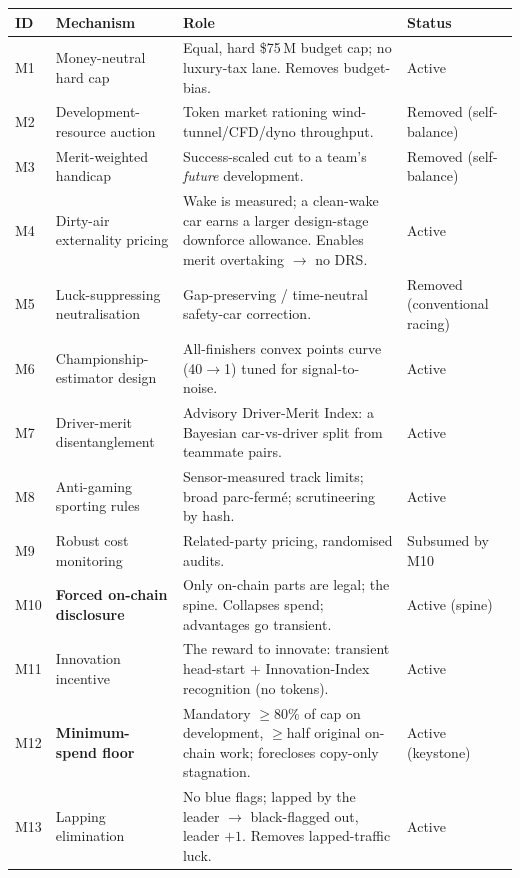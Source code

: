 \documentclass[11pt]{article}
\begin{document}
{\footnotesize
\begin{center}
\begin{tabular}{@{}p{} p{} p{} p{}@{}}
\toprule
\textbf{ID} & \textbf{Mechanism} & \textbf{Role} & \textbf{Status}\\
\midrule
M1 & Money-neutral hard cap & Equal, hard \$75\,M budget cap; no luxury-tax lane. Removes budget-bias. & Active\\
M2 & Development-resource auction & Token market rationing wind-tunnel/CFD/dyno throughput. & Removed (self-balance)\\
M3 & Merit-weighted handicap & Success-scaled cut to a team's \emph{future} development. & Removed (self-balance)\\
M4 & Dirty-air externality pricing & Wake is measured; a clean-wake car earns a larger design-stage downforce allowance. Enables merit overtaking $\to$ no DRS. & Active\\
M5 & Luck-suppressing neutralisation & Gap-preserving / time-neutral safety-car correction. & Removed (conventional racing)\\
M6 & Championship-estimator design & All-finishers convex points curve (40$\to$1) tuned for signal-to-noise. & Active\\
M7 & Driver-merit disentanglement & Advisory Driver-Merit Index: a Bayesian car-vs-driver split from teammate pairs. & Active\\
M8 & Anti-gaming sporting rules & Sensor-measured track limits; broad parc-ferm\'e; scrutineering by hash. & Active\\
M9 & Robust cost monitoring & Related-party pricing, randomised audits. & Subsumed by M10\\
M10 & \textbf{Forced on-chain disclosure} & Only on-chain parts are legal; the spine. Collapses spend; advantages go transient. & Active (spine)\\
M11 & Innovation incentive & The reward to innovate: transient head-start + Innovation-Index recognition (no tokens). & Active\\
M12 & \textbf{Minimum-spend floor} & Mandatory $\geq$80\% of cap on development, $\geq$half original on-chain work; forecloses copy-only stagnation. & Active (keystone)\\
M13 & Lapping elimination & No blue flags; lapped by the leader $\to$ black-flagged out, leader $+1$. Removes lapped-traffic luck. & Active\\
\bottomrule
\end{tabular}
\end{center}}
\end{document}
